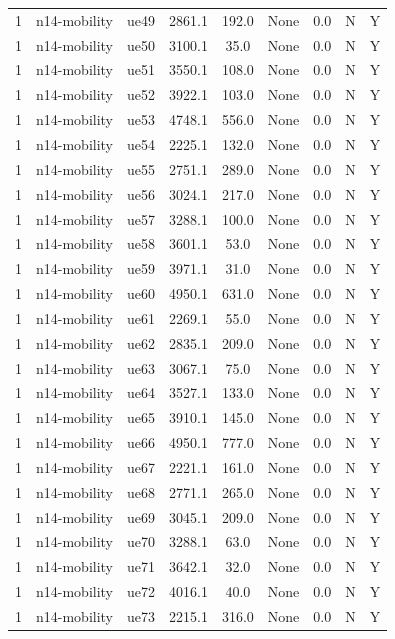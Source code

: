 \begin{table}[ht]
\begin{tabular}{|c|c|c|c|c|c|c|c|c|}
1 & n14-mobility & ue49 & 2861.1 & 192.0 & None & 0.0 & N & Y \\
1 & n14-mobility & ue50 & 3100.1 & 35.0 & None & 0.0 & N & Y \\
1 & n14-mobility & ue51 & 3550.1 & 108.0 & None & 0.0 & N & Y \\
1 & n14-mobility & ue52 & 3922.1 & 103.0 & None & 0.0 & N & Y \\
1 & n14-mobility & ue53 & 4748.1 & 556.0 & None & 0.0 & N & Y \\
1 & n14-mobility & ue54 & 2225.1 & 132.0 & None & 0.0 & N & Y \\
1 & n14-mobility & ue55 & 2751.1 & 289.0 & None & 0.0 & N & Y \\
1 & n14-mobility & ue56 & 3024.1 & 217.0 & None & 0.0 & N & Y \\
1 & n14-mobility & ue57 & 3288.1 & 100.0 & None & 0.0 & N & Y \\
1 & n14-mobility & ue58 & 3601.1 & 53.0 & None & 0.0 & N & Y \\
1 & n14-mobility & ue59 & 3971.1 & 31.0 & None & 0.0 & N & Y \\
1 & n14-mobility & ue60 & 4950.1 & 631.0 & None & 0.0 & N & Y \\
1 & n14-mobility & ue61 & 2269.1 & 55.0 & None & 0.0 & N & Y \\
1 & n14-mobility & ue62 & 2835.1 & 209.0 & None & 0.0 & N & Y \\
1 & n14-mobility & ue63 & 3067.1 & 75.0 & None & 0.0 & N & Y \\
1 & n14-mobility & ue64 & 3527.1 & 133.0 & None & 0.0 & N & Y \\
1 & n14-mobility & ue65 & 3910.1 & 145.0 & None & 0.0 & N & Y \\
1 & n14-mobility & ue66 & 4950.1 & 777.0 & None & 0.0 & N & Y \\
1 & n14-mobility & ue67 & 2221.1 & 161.0 & None & 0.0 & N & Y \\
1 & n14-mobility & ue68 & 2771.1 & 265.0 & None & 0.0 & N & Y \\
1 & n14-mobility & ue69 & 3045.1 & 209.0 & None & 0.0 & N & Y \\
1 & n14-mobility & ue70 & 3288.1 & 63.0 & None & 0.0 & N & Y \\
1 & n14-mobility & ue71 & 3642.1 & 32.0 & None & 0.0 & N & Y \\
1 & n14-mobility & ue72 & 4016.1 & 40.0 & None & 0.0 & N & Y \\
1 & n14-mobility & ue73 & 2215.1 & 316.0 & None & 0.0 & N & Y \\

\end{tabular}
\end{table}
